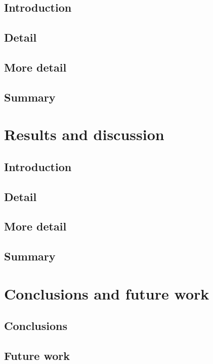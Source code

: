 \documentclass[report,11pt]{article}
\begin{document}
    \subsection{Introduction}
	
	\subsection{Detail}
   
	\subsection{More detail}
	
	
	\subsection{Summary}
	

\section{Results and discussion} %
    \subsection{Introduction}
	
	\subsection{Detail}
 
	\subsection{More detail}
	
	\subsection{Summary}
	


\section{Conclusions and future work} %
    \subsection{Conclusions}

	\subsection{Future work}


%
\end{document}
